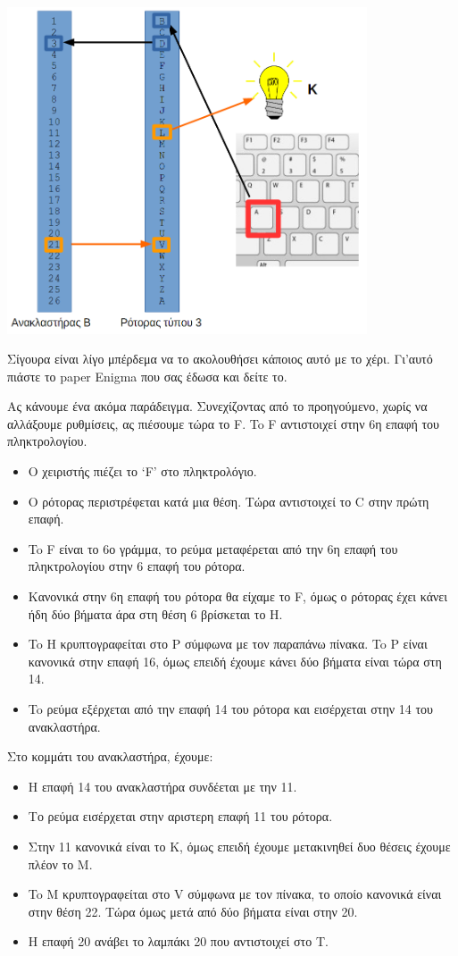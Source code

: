 \documentclass[a4paper,twoside,12pt]{article}
\begin{document}
\begin{center}
  \includegraphics[width=0.8\textwidth]{images/main/enigma-single-rotor}
\end{center}

Σίγουρα είναι λίγο μπέρδεμα να το ακολουθήσει κάποιος αυτό με το χέρι. Γι'αυτό πιάστε το paper Enigma που σας έδωσα και δείτε το.

Ας κάνουμε ένα ακόμα παράδειγμα. Συνεχίζοντας από το προηγούμενο, χωρίς να αλλάξουμε ρυθμίσεις, ας πιέσουμε τώρα το F. To F αντιστοιχεί στην 6η επαφή του πληκτρολογίου.

\begin{itemize}
\item Ο χειριστής πιέζει το `F' στο πληκτρολόγιο.
\item Ο ρότορας περιστρέφεται κατά μια θέση. Τώρα αντιστοιχεί το C στην πρώτη επαφή.
\item To F είναι το 6ο γράμμα, το ρεύμα μεταφέρεται από την 6η επαφή του πληκτρολογίου στην 6 επαφή του ρότορα.
\item Κανονικά στην 6η επαφή του ρότορα θα είχαμε το F, όμως ο ρότορας έχει κάνει ήδη δύο βήματα άρα στη θέση 6 βρίσκεται το H.
\item To H κρυπτογραφείται στο P σύμφωνα με τον παραπάνω πίνακα. To P είναι κανονικά στην επαφή 16, όμως επειδή έχουμε κάνει δύο βήματα είναι τώρα στη 14.
\item To ρεύμα εξέρχεται από την επαφή 14 του ρότορα και εισέρχεται στην 14 του ανακλαστήρα.
\end{itemize}

Στο κομμάτι του ανακλαστήρα, έχουμε:

\begin{itemize}
\item Η επαφή 14 του ανακλαστήρα συνδέεται με την 11.
\item Το ρεύμα εισέρχεται στην αριστερη επαφή 11 του ρότορα.
\item Στην 11 κανονικά είναι το Κ, όμως επειδή έχουμε μετακινηθεί δυο θέσεις έχουμε πλέον το Μ.
\item To M κρυπτογραφείται στο V σύμφωνα με τον πίνακα, το οποίο κανονικά είναι στην θέση 22. Τώρα όμως μετά από δύο βήματα είναι στην 20.
\item H επαφή 20 ανάβει το λαμπάκι 20 που αντιστοιχεί στο Τ.
\end{itemize}
\end{document}
